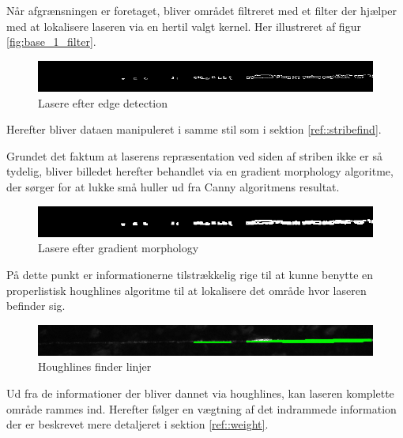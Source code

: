 Når afgrænsningen er foretaget, bliver området filtreret med et filter der hjælper med at lokalisere laseren via en hertil valgt kernel. Her illustreret af figur \ref{fig:base_1_filter}.

\begin{figure}[h]
	\centering
	\includegraphics[width=0.7\linewidth]{Billeder/base_2_canny}
	\caption{Lasere efter edge detection}
	\label{fig:base_2_canny}
\end{figure}

Herefter bliver dataen manipuleret i samme stil som i sektion \ref{ref::stribefind}.

Grundet det faktum at laserens repræsentation ved siden af striben ikke er så tydelig, bliver billedet herefter behandlet via en gradient morphology algoritme, der sørger for at lukke små huller ud fra Canny algoritmens resultat.

\begin{figure}[h]
	\centering
	\includegraphics[width=0.7\linewidth]{Billeder/base_3_morph}
	\caption{Lasere efter gradient morphology}
	\label{fig:base_3_morph}
\end{figure}

På dette punkt er informationerne tilstrækkelig rige til at kunne benytte en properlistisk houghlines algoritme til at lokalisere det område hvor laseren befinder sig.

\begin{figure}[h!]
	\centering
	\includegraphics[width=0.7\linewidth]{Billeder/base_4_houghP}
	\caption{Houghlines finder linjer}
	\label{fig:base_4_hough}
\end{figure}

Ud fra de informationer der bliver dannet via houghlines, kan laseren komplette område rammes ind. Herefter følger en vægtning af det indrammede information der er beskrevet mere detaljeret i sektion \ref{ref::weight}.

